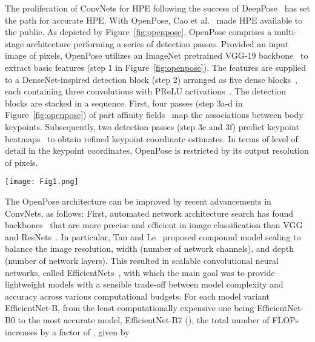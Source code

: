 The proliferation of ConvNets for HPE following the success of DeepPose~\cite{toshev2014deeppose} has set the path for accurate HPE. With OpenPose, Cao et al.~\cite{cao2018openpose} made HPE available to the public. As depicted by Figure~\ref{fig:openpose}, OpenPose comprises a multi-stage architecture performing a series of detection passes. Provided an input image of  pixels, OpenPose utilizes an ImageNet pretrained VGG-19 backbone~\cite{simonyan2014very} to extract basic features (step 1 in Figure~\ref{fig:openpose}). The features are supplied to a DenseNet-inspired detection block (step 2) arranged as five dense blocks~\cite{huang2017densely}, each containing three  convolutions with PReLU activations~\cite{he2015delving}. The detection blocks are stacked in a sequence. First, four passes (step 3a-d in Figure~\ref{fig:openpose}) of part affinity fields~\cite{cao2017realtime} map the associations between body keypoints. Subsequently, two detection passes (step 3e and 3f) predict keypoint heatmaps~\cite{tompson2014joint} to obtain refined keypoint coordinate estimates. In terms of level of detail in the keypoint coordinates, OpenPose is restricted by its output resolution of  pixels.

\begin{figure*}
\begin{center}
\texttt{[image: Fig1.png]}
\caption{OpenPose architecture utilizing 1) VGG-19 feature extractor, and 2) 4+2 passes of detection blocks performing 4+2 passes of estimating part affinity fields (3a-d) and confidence maps (3e and 3f)}
\label{fig:openpose}       
\end{center}
\end{figure*}
   
The OpenPose architecture can be improved by recent advancements in ConvNets, as follows: First, automated network architecture search has found backbones~\cite{tan2019efficientnet, zoph2018learning, tan2019mixconv} that are more precise and efficient in image classification than VGG and ResNets~\cite{simonyan2014very, he2016deep}. In particular, Tan and Le~\cite{tan2019efficientnet} proposed compound model scaling to balance the image resolution, width (number of network channels), and depth (number of network layers). This resulted in scalable convolutional neural networks, called EfficientNets~\cite{tan2019efficientnet}, with which the main goal was to provide lightweight models with a sensible trade-off between model complexity and accuracy across various computational budgets. For each model variant EfficientNet-B, from the least computationally expensive one being EfficientNet-B0 to the most accurate model, EfficientNet-B7 (), the total number of FLOPs increases by a factor of , given by

